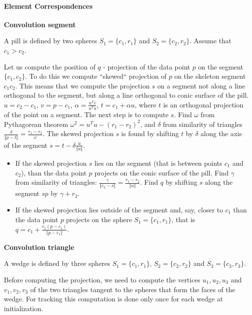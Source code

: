 
\paragraph{Element Correspondences}


\textbf{Convolution segment}

A pill is defined by two spheres $S_1 = \{c_1, r_1\}$ and $S_2 = \{c_2, r_2\}$. Assume that $c_1 > c_2$. 

Let us compute the position of $q$  - projection of the data point $p$ on the segment $\{c_1, c_2\}$.  To do this we compute ``skewed`` projection of $p$ on the skeleton segment $c_1 c_2$. This means that we compute the projection $s$ on a segment not along a line orthogonal to the segment, but along a line orthogonal to conic surface of the pill.
$u = c_2 - c_1$,  
$ v = p - c_1$, 
$\alpha = \frac{u^T v }{u^T  u}$, 
$ t = c_1 + \alpha u $,
where $t$ is an orthogonal projection of the point on a segment. The next step is to compute $s$.
Find $\omega$ from Pythagorean theorem 
$\omega^2 = u^T u - (r_1 - r_2)^2$,
 and $\delta$ from similarity of triangles
$\frac{\delta}{\Vert p - t  \Vert} =  \frac{r_1 - r_2}{\omega}$. The skewed projection $s$ is found by shifting $t$ by $\delta$ along the axis of the segment $s = t - \delta  \frac{u} {\Vert u \Vert}$.


\begin{itemize}
\item If the skewed projection $s$ lies on the segment (that is between points $c_1$ and $c_2$), than the data point $p$ projects on the conic surface of the 	pill. Find $\gamma$ from similarity of triangles:  $\frac{\gamma}{ {\Vert c_2 - s}\Vert} = \frac{r_1 - r_2} {\Vert u \Vert}$. Find $q$ by shifting $s$ along the segment $sp$ by $\gamma + r_2$.
\item If the skewed projection lies outside of the segment and, say, closer to $c_1$ than the data point $p$ projects on the sphere  $S_1 = \{c_1, r_1\}$, that is  $q = c_1 + \frac{r_1  (p - c_1)}{\Vert p - c_1 \Vert}$. 
\end{itemize}


\textbf{Convolution triangle}

A wedge is defined by three spheres $S_1 = \{c_1, r_1\}$, $S_2 = \{c_2, r_2\}$ and $S_3 = \{c_3, r_3\}$. 

Before computing the projection, we need to compute the vertices $u_1, u_2, u_3$ and $v_1, v_2, v_3$ of the two triangles tangent to the spheres that form the faces of the wedge. For tracking this computation is done only once for each wedge at initialization.

